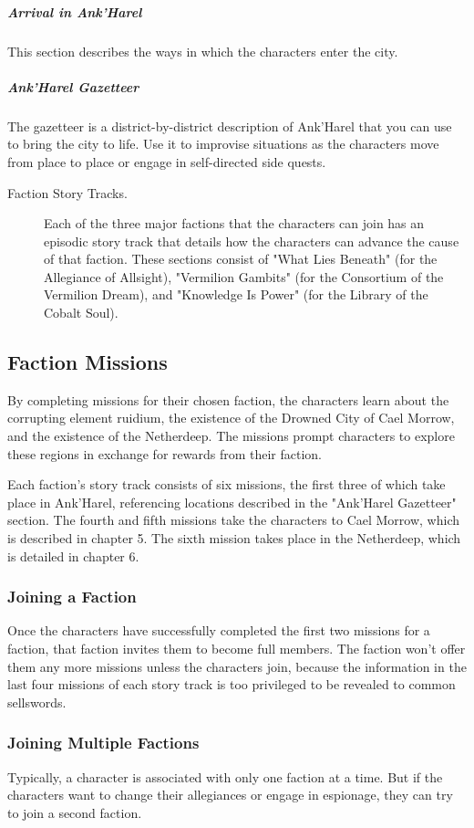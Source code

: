 \documentclass[10pt,a4paper,twoside,bg=print,twocolumn,openany,nodeprecatedcode]{dndbook}
\begin{document}
\subparagraph{Arrival in Ank'Harel}
This section describes the ways in which the characters enter the city.

\subparagraph{Ank'Harel Gazetteer}
The gazetteer is a district-by-district description of Ank'Harel that you can use to bring the city to life. Use it to improvise situations as the characters move from place to place or engage in self-directed side quests.


\begin{description}
\item[Faction Story Tracks.]
Each of the three major factions that the characters can join has an episodic story track that details how the characters can advance the cause of that faction. These sections consist of "What Lies Beneath" (for the Allegiance of Allsight), "Vermilion Gambits" (for the Consortium of the Vermilion Dream), and "Knowledge Is Power" (for the Library of the Cobalt Soul).
\end{description}

\subsection{Faction Missions}
By completing missions for their chosen faction, the characters learn about the corrupting element ruidium, the existence of the Drowned City of Cael Morrow, and the existence of the Netherdeep. The missions prompt characters to explore these regions in exchange for rewards from their faction.

Each faction's story track consists of six missions, the first three of which take place in Ank'Harel, referencing locations described in the "Ank'Harel Gazetteer" section. The fourth and fifth missions take the characters to Cael Morrow, which is described in chapter 5. The sixth mission takes place in the Netherdeep, which is detailed in chapter 6.

\subsubsection{Joining a Faction}
Once the characters have successfully completed the first two missions for a faction, that faction invites them to become full members. The faction won't offer them any more missions unless the characters join, because the information in the last four missions of each story track is too privileged to be revealed to common sellswords.

\subsubsection{Joining Multiple Factions}
Typically, a character is associated with only one faction at a time. But if the characters want to change their allegiances or engage in espionage, they can try to join a second faction.
\end{document}
